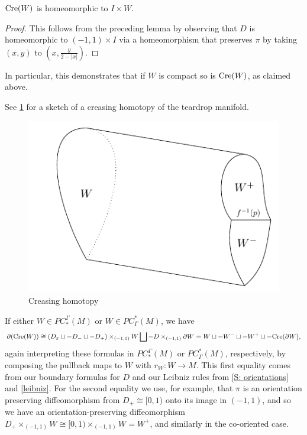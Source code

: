 \begin{corollary}
$\mathrm{Cre}(W)$ is homeomorphic to $I \times W$.
\end{corollary}
\begin{proof}
This follows from the preceding lemma by observing that $D$ is homeomorphic to $(-1,1) \times I$ via a homeomorphism that preserves $\pi$ by taking $(x,y)$ to $\left(x, \frac{y}{2-|x|}\right)$.
\end{proof}


In particular, this demonstrates that if $W$ is compact so is $\mathrm{Cre}(W)$, as claimed above.

See \cref{F: creasing} for a sketch of a creasing homotopy of the teardrop manifold.



\begin{figure}
	\includegraphics{figures/creasing2.pdf}
	\caption{Creasing homotopy}
	\label{F: creasing}
\end{figure}



If either $W \in PC^\Gamma_*(M)$ or $W \in PC_\Gamma^*(M)$, we have
\begin{equation}\label{E: bd crease}
\partial(\mathrm{Cre}(W))\cong(D_x \sqcup -D_- \sqcup -D_+)\times_{(-1,1)} W \bigsqcup -D\times_{(-1,1)}\partial W = W \sqcup -W^- \sqcup -W^+ \sqcup -\mathrm{Cre}(\partial W),
\end{equation}
again interpreting these formulas in $PC^\Gamma_*(M)$ or $PC_\Gamma^*(M)$, respectively, by composing the pullback maps to $W$ with $r_W \colon W \to M$. This first equality comes from our boundary formulas for $D$ and our Leibniz rules from \cref{S: orientations} and \cref{leibniz}. For the second equality we use, for example, that $\pi$ is an orientation preserving diffeomorphism from $D_+ \cong [0,1)$ onto its image in $(-1,1)$, and so we have an orientation-preserving diffeomorphism $D_+\times_{(-1,1)} W \cong [0,1)\times_{(-1,1)} W = W^+$, and similarly in the co-oriented case.

